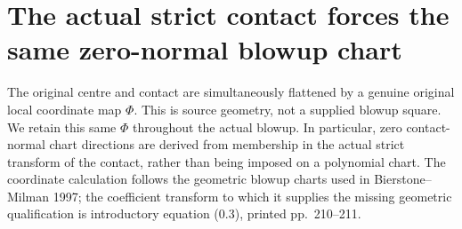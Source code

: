 \chapter{The actual strict contact forces the same zero-normal blowup chart}

The original centre and contact are simultaneously flattened by a genuine original local coordinate map $\Phi$. This is source geometry, not a supplied blowup square. We retain this same $\Phi$ throughout the actual blowup. In particular, zero contact-normal chart directions are derived from membership in the actual strict transform of the contact, rather than being imposed on a polynomial chart. The coordinate calculation follows the geometric blowup charts used in Bierstone--Milman 1997; the coefficient transform to which it supplies the missing geometric qualification is introductory equation (0.3), printed pp.~210--211.

